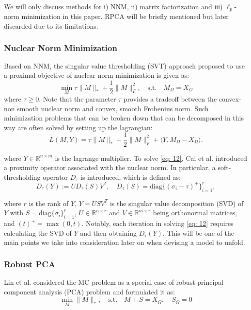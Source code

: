 We will only discuss methods for i) NNM, ii) matrix factorization and iii) $\ell_p$-norm minimization in this paper. RPCA will be briefly mentioned but later discarded due to its limitations.

\subsubsection{Nuclear Norm Minimization}
Based on NNM, the singular value thresholding (SVT) \cite{SVT} approach proposed to use a proximal objective of nuclear norm minimization is given as:
\[
\min_{M} \tau \|M\|_* + \frac{1}{2} \|M\|_F^2, \quad \text{s.t.} \quad M_{\Omega} = X_{\Omega} 
\]
where $\tau \geq 0$. Note that the parameter $\tau$ provides a tradeoff between the convex-non smooth nuclear norm and convex, smooth Frobenius norm. Such minimization problems that can be broken down that can be decomposed in this way are often solved by setting up the lagrangian:
\begin{equation}
    L(M, Y) = \tau \|M\|_* + \frac{1}{2} \|M\|_F^2 + \langle Y, M_{\Omega} - X_{\Omega} \rangle. \label{eq: 12}
\end{equation}

where $Y \in \mathbb{R}^{n \times m}$ is the lagrange multiplier. 
To solve \ref{eq: 12}, Cai et al. \cite{cai2010singular} introduced a proximity operator associated with the nuclear norm. In particular, a soft-thresholding operator $D_{\tau}$ is introduced, which is defined as:
\begin{equation}
    D_{\tau}(Y) := U D_{\tau}(S) V^T, \quad D_{\tau}(S) = \text{diag}\{(\sigma_i - \tau)^+\}_{i=1}^r,
\end{equation}

where $r$ is the rank of $Y$, $Y = USV^T$ is the singular value decomposition (SVD) of $Y$ with $S = \text{diag}\{\sigma_i\}_{i=1}^r$, $U \in \mathbb{R}^{n \times r}$ and $V \in \mathbb{R}^{m \times r}$ being orthonormal matrices, and $(t)^+ = \max(0, t)$. Notably, each iteration in solving \ref{eq: 12} requires calculating the SVD of $Y$ and then obtaining $D_{\tau}(Y)$. This will be one of the main points we take into consideration later on when devising a model to unfold. 

\subsubsection{Robust PCA}
Lin et al. \cite{rpca} considered the MC problem as a special case of robust principal component analysis (PCA) problem and formulated it as:
\begin{equation}
    \min_{M} \|M\|_*, \quad \text{s.t.} \quad M + S = X_{\Omega}, \quad S_{\Omega} = 0 \label{eq: 13}
\end{equation}

